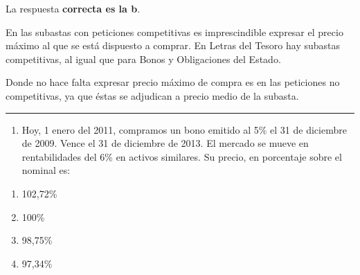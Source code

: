\documentclass[
  letterpaper,
  DIV=11,
  numbers=noendperiod]{scrreprt}
\providecommand{\tightlist}{%
  \setlength{\itemsep}{0pt}\setlength{\parskip}{0pt}}\usepackage{longtable,booktabs,array}
\begin{document}
\begin{tcolorbox}[enhanced jigsaw, left=2mm, opacityback=0, colback=white, breakable, arc=.35mm, bottomrule=.15mm, rightrule=.15mm, toprule=.15mm, leftrule=.75mm, colframe=quarto-callout-tip-color-frame]
\begin{minipage}[t]{5.5mm}
\textcolor{quarto-callout-tip-color}{\faLightbulb}
\end{minipage}%
\begin{minipage}[t]{\textwidth - 5.5mm}

La respuesta \textbf{correcta es la b}.

En las subastas con peticiones competitivas es imprescindible expresar
el precio máximo al que se está dispuesto a comprar. En Letras del
Tesoro hay subastas competitivas, al igual que para Bonos y Obligaciones
del Estado.

Donde no hace falta expresar precio máximo de compra es en las
peticiones no competitivas, ya que éstas se adjudican a precio medio de
la subasta.

\end{minipage}%
\end{tcolorbox}

\begin{center}\rule{0.5\linewidth}{0.5pt}\end{center}

\begin{enumerate}
\def\labelenumi{\arabic{enumi}.}
\setcounter{enumi}{103}
\tightlist
\item
  Hoy, 1 enero del 2011, compramos un bono emitido al 5\% el 31 de
  diciembre de 2009. Vence el 31 de diciembre de 2013. El mercado se
  mueve en rentabilidades del 6\% en activos similares. Su precio, en
  porcentaje sobre el nominal es:
\end{enumerate}

\begin{enumerate}
\def\labelenumi{\alph{enumi})}
\item
  102,72\%
\item
  100\%
\item
  98,75\%
\item
  97,34\%
\end{enumerate}
\end{document}
